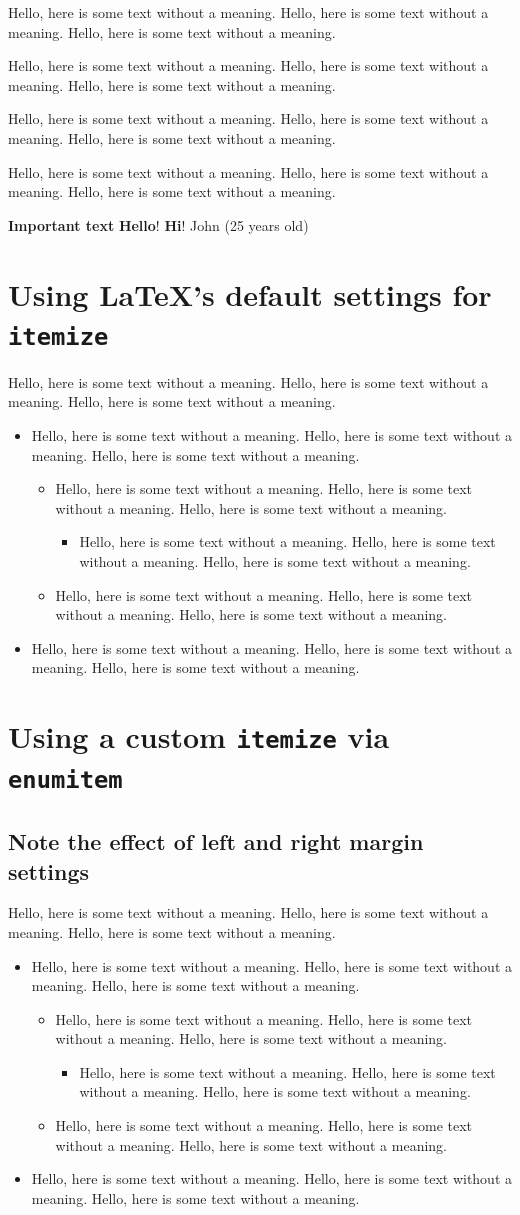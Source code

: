\documentclass{article}
\newcommand{\randomtext}{Hello, here is some text without a meaning. Hello, here is some text without a meaning. Hello, here is some text without a meaning.}
\newcommand{\highlight}[1]{\textbf{#1}}
\newcommand{\greeting}[1][Hello]{\textbf{#1}!}
\newcommand{\person}[2]{#1 (#2 years old)}
\begin{document}
	\noindent\randomtext
	
	\begin{boxlabel}
		\item \randomtext
		\item \randomtext
		\item \randomtext
	\end{boxlabel}
	
	\highlight{Important text}
	\greeting           %
	\greeting[Hi]       %
	\person{John}{25}   %
	
	\section*{Using LaTeX's default settings for \texttt{itemize}}
	
	\randomtext
	
	\begin{itemize}
		\item \randomtext
		\begin{itemize}
			\item \randomtext
			\begin{itemize}
				\item \randomtext
			\end{itemize}
			\item \randomtext
		\end{itemize}
		\item \randomtext
	\end{itemize}
	
	\section*{Using a custom \texttt{itemize} via \texttt{enumitem}}
	
	\subsection*{Note the effect of left and right margin settings}
	
	\randomtext
	
	\begin{itemize}[leftmargin=30pt, rightmargin=2cm]
		\item \randomtext
		\begin{itemize}
			\item \randomtext
			\begin{itemize}
				\item \randomtext
			\end{itemize}
			\item \randomtext
		\end{itemize}
		\item \randomtext
	\end{itemize}
	
\end{document}
